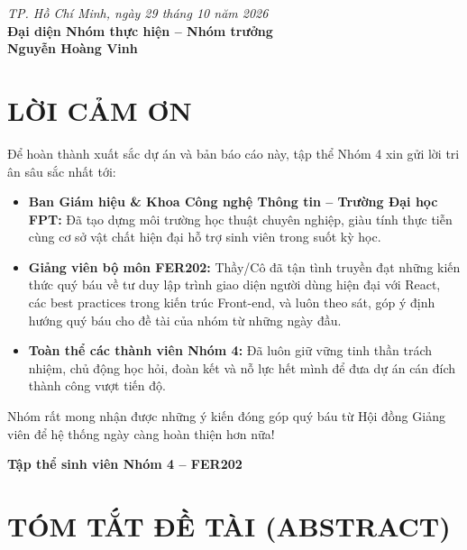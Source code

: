 \documentclass[12pt,a4paper,oneside]{report}
\begin{document}
\vspace{1.5cm}
\begin{flushright}
\textit{TP. Hồ Chí Minh, ngày 29 tháng 10 năm 2026}\\[0.3cm]
\textbf{Đại diện Nhóm thực hiện -- Nhóm trưởng}\\[1.5cm]
\textbf{Nguyễn Hoàng Vinh}
\end{flushright}

\newpage
\chapter*{LỜI CẢM ƠN}
Để hoàn thành xuất sắc dự án và bản báo cáo này, tập thể Nhóm 4 xin gửi lời tri ân sâu sắc nhất tới:
\begin{itemize}
    \item \textbf{Ban Giám hiệu \& Khoa Công nghệ Thông tin -- Trường Đại học FPT:} Đã tạo dựng môi trường học thuật chuyên nghiệp, giàu tính thực tiễn cùng cơ sở vật chất hiện đại hỗ trợ sinh viên trong suốt kỳ học.
    \item \textbf{Giảng viên bộ môn FER202:} Thầy/Cô đã tận tình truyền đạt những kiến thức quý báu về tư duy lập trình giao diện người dùng hiện đại với React, các best practices trong kiến trúc Front-end, và luôn theo sát, góp ý định hướng quý báu cho đề tài của nhóm từ những ngày đầu.
    \item \textbf{Toàn thể các thành viên Nhóm 4:} Đã luôn giữ vững tinh thần trách nhiệm, chủ động học hỏi, đoàn kết và nỗ lực hết mình để đưa dự án cán đích thành công vượt tiến độ.
\end{itemize}

Nhóm rất mong nhận được những ý kiến đóng góp quý báu từ Hội đồng Giảng viên để hệ thống ngày càng hoàn thiện hơn nữa!

\vspace{1.5cm}
\begin{flushright}
\textbf{Tập thể sinh viên Nhóm 4 -- FER202}
\end{flushright}

\newpage
\chapter*{TÓM TẮT ĐỀ TÀI (ABSTRACT)}
\end{document}
